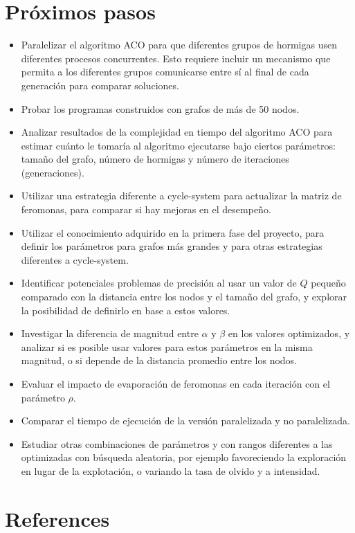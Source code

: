 \documentclass[conference]{IEEEtran}
\begin{document}
\section{Próximos pasos}
\begin{itemize}
\item Paralelizar el algoritmo ACO para que diferentes grupos de hormigas usen diferentes procesos concurrentes. Esto requiere incluir un mecanismo que permita a los diferentes grupos comunicarse entre sí al final de cada generación para comparar soluciones.
\item Probar los programas construidos con grafos de más de 50 nodos. 
\item Analizar resultados de la complejidad en tiempo del algoritmo ACO para estimar cuánto le tomaría al algoritmo ejecutarse bajo ciertos parámetros: tamaño del grafo, número de hormigas y número de iteraciones (generaciones).
\item Utilizar una estrategia diferente a cycle-system para actualizar la matriz de feromonas, para comparar si hay mejoras en el desempeño. 
\item Utilizar el conocimiento adquirido en la primera fase del proyecto, para definir los parámetros para grafos más grandes y para otras estrategias diferentes a cycle-system.
\item Identificar potenciales problemas de precisión al usar un valor de $Q$ pequeño comparado con la distancia entre los nodos y el tamaño del grafo, y explorar la posibilidad de definirlo en base a estos valores.
\item Investigar la diferencia de magnitud entre $\alpha$ y $\beta$ en los valores optimizados, y analizar si es posible usar valores para estos parámetros en la misma magnitud, o si depende de la distancia promedio entre los nodos.
\item Evaluar el impacto de evaporación de feromonas en cada iteración con el parámetro $\rho$.
\item Comparar el tiempo de ejecución de la versión paralelizada y no paralelizada.
\item Estudiar otras combinaciones de parámetros y con rangos diferentes a las optimizadas con búsqueda aleatoria, por ejemplo favoreciendo la exploración en lugar de la explotación, o variando la tasa de olvido y a intensidad.
\end{itemize}
\section*{References}
\end{document}
